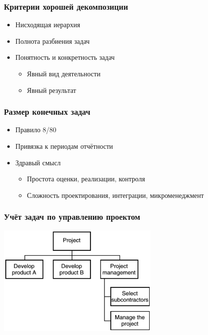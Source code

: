 \documentclass{../../slides-style}
\begin{document}
    \begin{frame}
        \frametitle{Критерии хорошей декомпозиции}
        \begin{itemize}
            \item Нисходящая иерархия
            \item Полнота разбиения задач
            \item Понятность и конкретность задач
            \begin{itemize}
                \item Явный вид деятельности
                \item Явный результат
            \end{itemize} 
        \end{itemize}
    \end{frame}

    \begin{frame}
        \frametitle{Размер конечных задач}
        \begin{itemize}
            \item Правило 8/80
            \item Привязка к периодам отчётности
            \item Здравый смысл
            \begin{itemize}
                \item Простота оценки, реализации, контроля
                \item Сложность проектирования, интеграции, микроменеджмент
            \end{itemize} 
        \end{itemize}
    \end{frame}

    \begin{frame}
        \frametitle{Учёт задач по управлению проектом}
        \begin{center}
            \includegraphics[width=0.6\textwidth]{wbsProjectManagementTasks.png}
        \end{center}
    \end{frame}
\end{document}
